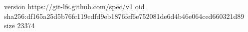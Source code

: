 version https://git-lfs.github.com/spec/v1
oid sha256:df165a25d5b76fc119edfd9eb1876fef6e752081de6d4b46e064ced660321d89
size 23374
